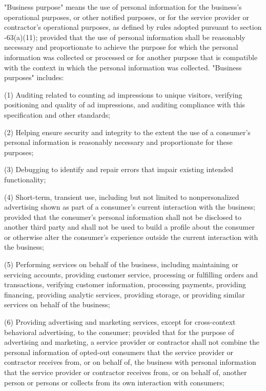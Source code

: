      "Business purpose" means the use of personal information for the business's operational purposes, or other notified purposes, or for the service provider or contractor's operational purposes, as defined by rules adopted pursuant to section    -63(a)(11); provided that the use of personal information shall be reasonably necessary and proportionate to achieve the purpose for which the personal information was collected or processed or for another purpose that is compatible with the context in which the personal information was collected.  "Business purposes" includes:

     (1)  Auditing related to counting ad impressions to unique visitors, verifying positioning and quality of ad impressions, and auditing compliance with this specification and other standards;

     (2)  Helping ensure security and integrity to the extent the use of a consumer's personal information is reasonably necessary and proportionate for these purposes;

     (3)  Debugging to identify and repair errors that impair existing intended functionality;

     (4)  Short-term, transient use, including but not limited to nonpersonalized advertising shown as part of a consumer's current interaction with the business; provided that the consumer's personal information shall not be disclosed to another third party and shall not be used to build a profile about the consumer or otherwise alter the consumer's experience outside the current interaction with the business;

     (5)  Performing services on behalf of the business, including maintaining or servicing accounts, providing customer service, processing or fulfilling orders and transactions, verifying customer information, processing payments, providing financing, providing analytic services, providing storage, or providing similar services on behalf of the business;

     (6)  Providing advertising and marketing services, except for cross-context behavioral advertising, to the consumer; provided that for the purpose of advertising and marketing, a service provider or contractor shall not combine the personal information of opted-out consumers that the service provider or contractor receives from, or on behalf of, the business with personal information that the service provider or contractor receives from, or on behalf of, another person or persons or collects from its own interaction with consumers;

